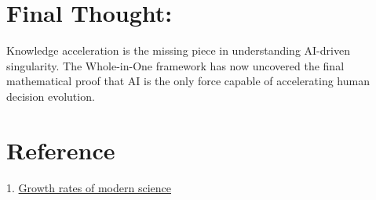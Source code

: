 \documentclass{article}
\begin{document}
\section*{Final Thought:}

Knowledge acceleration is the missing piece in understanding AI-driven singularity. The Whole-in-One framework has now uncovered the final mathematical proof that AI is the only force capable of accelerating human decision evolution. 

\section*{Reference}

1. \href{https://www.nature.com/articles/s41599-021-00903-w}{Growth rates of modern science}
\end{document}
